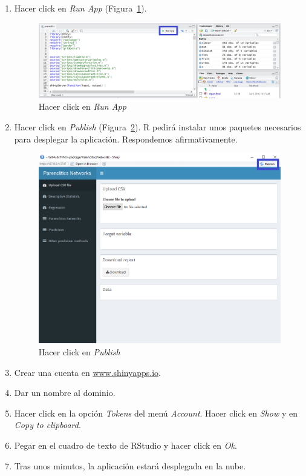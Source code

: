 \begin{enumerate}
	\item Hacer click en \textit{Run App} (Figura~\ref{fig:runapp}).
	
	\begin{figure}[htbp!]
		\centering
		\includegraphics[width=0.7\linewidth]{imagenes/runapp}
		\caption{Hacer click en \textit{Run App}}
		\label{fig:runapp}
	\end{figure}
	
	\item Hacer click en \textit{Publish} (Figura~\ref{fig:publish}). R pedirá instalar unos paquetes necesarios para desplegar la aplicación. Respondemos afirmativamente.
	
	\begin{figure}[htbp!]
		\centering
		\includegraphics[width=0.7\linewidth]{imagenes/publish}
		\caption{Hacer click en \textit{Publish}}
		\label{fig:publish}
	\end{figure}
	
	\item Crear una cuenta en \url{www.shinyapps.io}.
	
	\item Dar un nombre al dominio.
	
	\item Hacer click en la opción \textit{Tokens} del menú \textit{Account}. Hacer click en \textit{Show} y en \textit{Copy to clipboard}.
	
	\item Pegar en el cuadro de texto de RStudio y hacer click en \textit{Ok}.
	
	\item Tras unos minutos, la aplicación estará desplegada en la nube.
	
\end{enumerate}